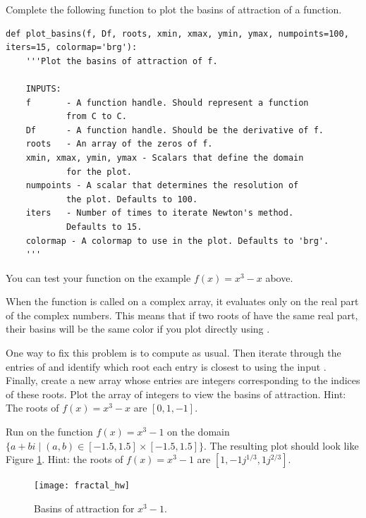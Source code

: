 \begin{problem}
\leavevmode

Complete the following function to plot the basins of attraction of a function.
\begin{lstlisting}
def plot_basins(f, Df, roots, xmin, xmax, ymin, ymax, numpoints=100, iters=15, colormap='brg'):
    '''Plot the basins of attraction of f.
    
    INPUTS:
    f       - A function handle. Should represent a function 
            from C to C.
    Df      - A function handle. Should be the derivative of f.
    roots   - An array of the zeros of f.
    xmin, xmax, ymin, ymax - Scalars that define the domain 
            for the plot.
    numpoints - A scalar that determines the resolution of 
            the plot. Defaults to 100.
    iters   - Number of times to iterate Newton's method. 
            Defaults to 15.
    colormap - A colormap to use in the plot. Defaults to 'brg'.    
    '''
\end{lstlisting}
You can test your function on the example $f(x) = x^3-x$ above. 

When the function  is called on a complex array, it evaluates only on the real part of the complex numbers.
This means that if two roots of  have the same real part, their basins will be the same color if you plot directly using .

One way to fix this problem is to compute  as usual.
Then iterate through the entries of  and identify which root each entry is closest to using the input .
Finally, create a new array whose entries are integers corresponding to the indices of these roots.
Plot the array of integers to view the basins of attraction.  Hint: The roots of $f(x) = x^3-x$ are $[0,1,-1]$.
\end{problem}

\begin{problem}

Run  on the function $f(x) = x^3-1$ on the domain $\{a+bi \mid (a, b) \in [-1.5, 1.5] \times [-1.5, 1.5] \}$. 
The resulting plot should look like Figure \ref{fig:fractal_hw}.  Hint: the roots of $f(x) = x^3-1$ are $[1,-1j^{1/3},1j^{2/3}]$.


\begin{figure}[H]
\begin{center}
\texttt{[image: fractal\_hw]}
\caption{Basins of attraction for $x^3-1$.}
\label{fig:fractal_hw}
\end{center}
\end{figure}
\end{problem}


